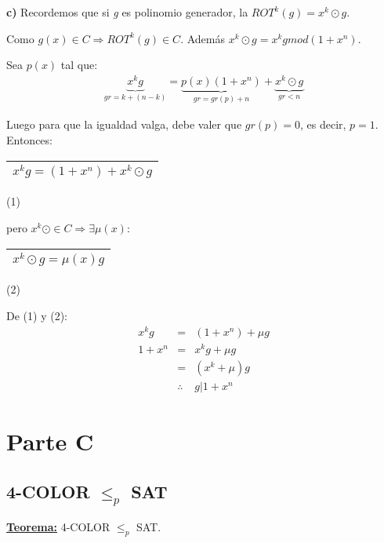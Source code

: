 \documentclass[12pt,a4paper]{report}
\begin{document}
			\textbf{c)} Recordemos que si \textit{g} es polinomio generador, la $ROT^{k}(g) = x^{k} \odot g$.
			\vspace{5mm}
			\par Como $g(x) \in C \Rightarrow ROT^{k}(g) \in C$. Además $x^{k} \odot g = x^{k} g mod (1 + x^{n}).$
			\vspace{3mm}
			\par Sea $p(x)$ tal que:
			\begin{eqnarray}
				\nonumber \underbrace{x^{k} g}_{gr = k + (n - k)} = \underbrace{p(x) (1 + x^{n})}_{gr = gr(p) + n} + \underbrace{x^{k} \odot g}_{gr < n}
			\end{eqnarray}
			\par Luego para que la igualdad valga, debe valer que $gr(p)	= 0$, es decir, $p = 1$. Entonces:
			\begin{center}
				\begin{tabular}{|c|} \hline $ x^{k} g = (1 + x^{n}) + x^{k} \odot g $ \\\hline \end{tabular} (1)
			\end{center}

			\par pero $x^{k} \odot \in C \Rightarrow \exists \mu(x) :$
			\begin{center}
				\begin{tabular}{|c|} \hline $ x^{k} \odot g = \mu(x) g $ \\\hline \end{tabular} (2)
			\end{center}

			\vspace{3mm}
			\par De (1) y (2):
			\begin{eqnarray}
				\nonumber x^{k} g &=& (1 + x^{n}) + \mu g \\
				\nonumber 1 + x^{n} &=& x^{k} g+ \mu g \\
				\nonumber &=& (x^{k} + \mu) g \\
				\nonumber & \therefore & g | 1 + x^{n}
			\end{eqnarray}



\chapter{Parte C}

	\section{4-COLOR $\leq_{\textit{p}}$ SAT}
		\textbf{\underline{Teorema:}} 4-COLOR $\leq_{p}$ SAT.
\end{document}
